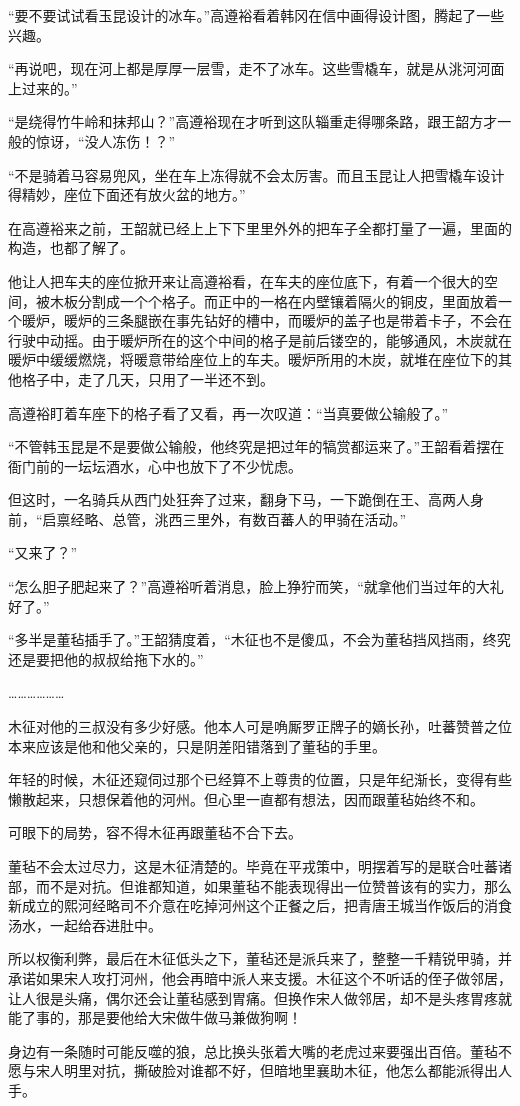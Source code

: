“要不要试试看玉昆设计的冰车。”高遵裕看着韩冈在信中画得设计图，腾起了一些兴趣。

“再说吧，现在河上都是厚厚一层雪，走不了冰车。这些雪橇车，就是从洮河河面上过来的。”

“是绕得竹牛岭和抹邦山？”高遵裕现在才听到这队辎重走得哪条路，跟王韶方才一般的惊讶，“没人冻伤！？”

“不是骑着马容易兜风，坐在车上冻得就不会太厉害。而且玉昆让人把雪橇车设计得精妙，座位下面还有放火盆的地方。”

在高遵裕来之前，王韶就已经上上下下里里外外的把车子全都打量了一遍，里面的构造，也都了解了。

他让人把车夫的座位掀开来让高遵裕看，在车夫的座位底下，有着一个很大的空间，被木板分割成一个个格子。而正中的一格在内壁镶着隔火的铜皮，里面放着一个暖炉，暖炉的三条腿嵌在事先钻好的槽中，而暖炉的盖子也是带着卡子，不会在行驶中动摇。由于暖炉所在的这个中间的格子是前后镂空的，能够通风，木炭就在暖炉中缓缓燃烧，将暖意带给座位上的车夫。暖炉所用的木炭，就堆在座位下的其他格子中，走了几天，只用了一半还不到。

高遵裕盯着车座下的格子看了又看，再一次叹道：“当真要做公输般了。”

“不管韩玉昆是不是要做公输般，他终究是把过年的犒赏都运来了。”王韶看着摆在衙门前的一坛坛酒水，心中也放下了不少忧虑。

但这时，一名骑兵从西门处狂奔了过来，翻身下马，一下跪倒在王、高两人身前，“启禀经略、总管，洮西三里外，有数百蕃人的甲骑在活动。”

“又来了？”

“怎么胆子肥起来了？”高遵裕听着消息，脸上狰狞而笑，“就拿他们当过年的大礼好了。”

“多半是董毡插手了。”王韶猜度着，“木征也不是傻瓜，不会为董毡挡风挡雨，终究还是要把他的叔叔给拖下水的。”

………………

木征对他的三叔没有多少好感。他本人可是唃厮罗正牌子的嫡长孙，吐蕃赞普之位本来应该是他和他父亲的，只是阴差阳错落到了董毡的手里。

年轻的时候，木征还窥伺过那个已经算不上尊贵的位置，只是年纪渐长，变得有些懒散起来，只想保着他的河州。但心里一直都有想法，因而跟董毡始终不和。

可眼下的局势，容不得木征再跟董毡不合下去。

董毡不会太过尽力，这是木征清楚的。毕竟在平戎策中，明摆着写的是联合吐蕃诸部，而不是对抗。但谁都知道，如果董毡不能表现得出一位赞普该有的实力，那么新成立的熙河经略司不介意在吃掉河州这个正餐之后，把青唐王城当作饭后的消食汤水，一起给吞进肚中。

所以权衡利弊，最后在木征低头之下，董毡还是派兵来了，整整一千精锐甲骑，并承诺如果宋人攻打河州，他会再暗中派人来支援。木征这个不听话的侄子做邻居，让人很是头痛，偶尔还会让董毡感到胃痛。但换作宋人做邻居，却不是头疼胃疼就能了事的，那是要他给大宋做牛做马兼做狗啊！

身边有一条随时可能反噬的狼，总比换头张着大嘴的老虎过来要强出百倍。董毡不愿与宋人明里对抗，撕破脸对谁都不好，但暗地里襄助木征，他怎么都能派得出人手。


